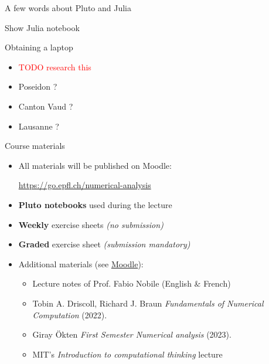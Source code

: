 \begin{frame}{A few words about Pluto and Julia}
    \begin{center}
        \Large{Show Julia notebook}
    \end{center}
\end{frame}

\begin{frame}{Obtaining a laptop}
    \begin{itemize}
        \item \textcolor{red}{TODO research this}
        \item Poseidon ?
        \item Canton Vaud ?
        \item Lausanne ?
    \end{itemize}
\end{frame}


\begin{frame}{Course materials}
    \begin{itemize}
        \item All materials will be published on \alert{Moodle:}
            \begin{center}
            \url{https://go.epfl.ch/numerical-analysis}
            \end{center}
        \vspace{1em}
        \item \textbf{Pluto notebooks} used during the lecture
        \item \textbf{Weekly} exercise sheets \textit{(no submission)}
        \item \textbf{Graded} exercise sheet \textit{(submission mandatory)}
        \vspace{1em}
        \item Additional materials (see \href{https://go.epfl.ch/numerical-analysis}{Moodle}):
            \begin{itemize}
                \item Lecture notes of Prof. Fabio Nobile (English \& French)
                \item Tobin A. Driscoll, Richard J. Braun
                    \textit{Fundamentals of Numerical Computation} (2022).
                \item Giray Ökten \textit{First Semester Numerical analysis} (2023).
                \item MIT's \textit{Introduction to computational thinking} lecture
            \end{itemize}
    \end{itemize}
\end{frame}

